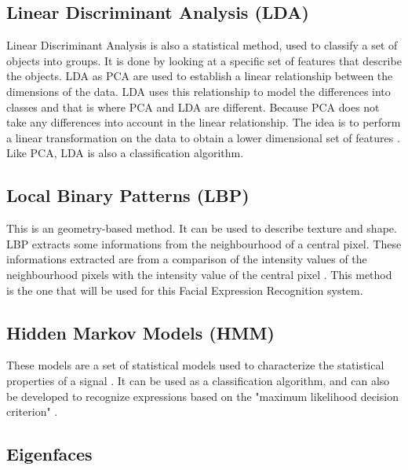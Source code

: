 \subsection{Linear Discriminant Analysis (LDA)}

\vspace{\baselineskip}
\noindent Linear Discriminant Analysis is also a statistical method, used to classify a set of objects into groups. It is done by looking at a specific set of features that describe the objects. LDA as PCA are used to establish a linear relationship between the dimensions of the data. LDA uses this relationship to model the differences into classes and that is where PCA and LDA are different. Because PCA does not take any differences into account in the linear relationship. The idea is to perform a linear transformation on the data to obtain a lower dimensional set of features \cite{GAN08}. Like PCA, LDA is also a classification algorithm.
\newline

\subsection{Local Binary Patterns (LBP)}

\vspace{\baselineskip}
\noindent This is an geometry-based method. It can be used to describe texture and shape. LBP extracts some informations from the neighbourhood of a central pixel. These informations extracted are from a comparison of the intensity values of the neighbourhood pixels with the intensity value of the central pixel \cite{GAN08}. This method is the one that will be used for this Facial Expression Recognition system.
\newline

\subsection{Hidden Markov Models (HMM)}

\vspace{\baselineskip}
\noindent These models are a set of statistical models used to characterize the statistical properties of a signal \cite{RAB93}. It can be used as a classification algorithm, and can also be developed to recognize expressions based on the "maximum likelihood decision criterion" \cite{LIE98}.
\newline

\subsection{Eigenfaces}

